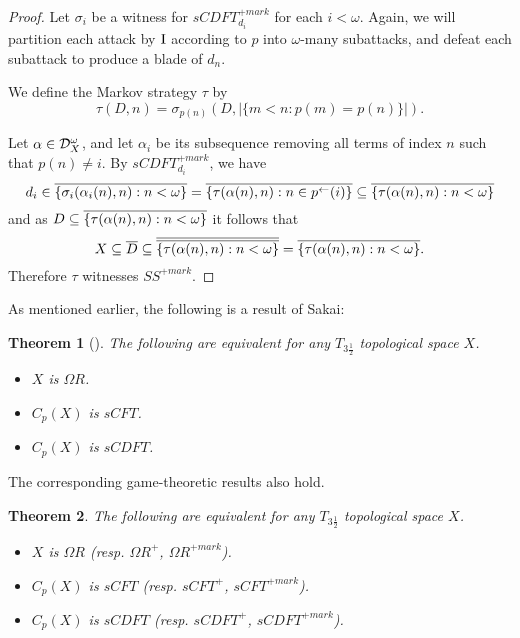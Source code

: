 \documentclass{amsart}
\theoremstyle{plain}
\newtheorem{theorem}{Theorem}
\theoremstyle{definition}
\theoremstyle{remark}
\theoremstyle{plain}
\theoremstyle{definition}
\theoremstyle{remark}
\begin{document}
\begin{proof}
  Let \(\sigma_i\) be a witness for \(sCDFT_{d_i}^{+mark}\)
  for each \(i<\omega\).
  Again, we will partition each
  attack by \(\mathrm{I}\) according to \(p\) into \(\omega\)-many subattacks, and
  defeat each subattack to produce a blade of \(d_n\).

  We define the Markov strategy \(\tau\) by
  \[
    \tau(D,n)
      =
    \sigma_{p(n)}(D,|\{m< n:p(m)=p(n)\}|)
  .\]

  Let \(\alpha\in\mathcal{D}_X^\omega\), and let \(\alpha_i\) be its subsequence
  removing all terms of index \(n\) such that \(p(n)\not=i\).
  By \(sCDFT_{d_i}^{+mark}\), we have
  \[
    d_i
      \in
    \overline{\{\sigma_i(\alpha_i(n),n):n<\omega\}}
      =
    \overline{\{\tau(\alpha(n),n):n\in p^{\leftarrow}(i)\}}
      \subseteq
    \overline{\{\tau(\alpha(n),n):n<\omega\}}
  \]
  and as \(D\subseteq\overline{\{\tau(\alpha(n),n):n<\omega\}}\)
  it follows that
  \[
    X
      \subseteq
    \overline{D}
      \subseteq
    \overline{\overline{\{\tau(\alpha(n),n):n<\omega\}}}
      =
    \overline{\{\tau(\alpha(n),n):n<\omega\}}
  .\]
  Therefore \(\tau\) witnesses \(SS^{+mark}\).
\end{proof}

As mentioned earlier, the following is a result of Sakai:

\begin{theorem}[\cite{MR964873}]
  The following are equivalent for any \(T_{3\frac{1}{2}}\)
  topological space \(X\).
    \begin{itemize}
      \item \(X\) is \(\Omega R\).
      \item \(C_p(X)\) is \(sCFT\).
      \item \(C_p(X)\) is \(sCDFT\).
    \end{itemize}
\end{theorem}

The corresponding game-theoretic results also hold.

\begin{theorem}
  The following are equivalent for any \(T_{3\frac{1}{2}}\)
  topological space \(X\).
    \begin{itemize}
      \item \(X\) is \(\Omega R\)
            (resp. \(\Omega R^+\), \(\Omega R^{+mark}\)).
      \item \(C_p(X)\) is \(sCFT\)
            (resp. \(sCFT^+\), \(sCFT^{+mark}\)).
      \item \(C_p(X)\) is \(sCDFT\)
            (resp. \(sCDFT^+\), \(sCDFT^{+mark}\)).
    \end{itemize}
\end{theorem}
\end{document}
